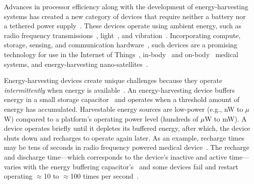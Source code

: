 

Advances in processor efficiency along with the development of
energy-harvesting systems has created a new category of devices that require
neither a battery nor a tethered power
supply~\citep{prasad_comst_2014,lucia_snapl_2017,soyata_csm_2016}. These
devices operate using ambient energy, such as radio frequency
transmissions~\citep{rf_powered_computing_gollakota_2014},
light~\citep{margolies_infocom_2016,margolies_tosn_2016}, and
vibration~\citep{gorlatova_sigmetrics_2014}. Incorporating compute, storage,
sensing, and communication hardware~\citep{wisp5,moo,capybara}, such devices are a
promising technology for use in the Internet of Things~\citep{ku_cst_2016},
in-body~\citep{nadeau_naturebio_2017} and
on-body~\citep{bandodkar_electroanalysis_2015} medical systems, and
energy-harvesting nano-satellites~\citep{kicksat,capybara}.

Energy-harvesting devices create unique challenges because they operate {\em
intermittently} when energy is
available~\citep{hicks_isca_2017,lucia_snapl_2017}. An energy-harvesting device
buffers energy in a small storage capacitor~\citep{gorlatova_tmc_2013,gunduz_commag_2014} and operates when a
threshold amount of energy has accumulated. Harvestable energy sources are low-power (e.g., nW to $\mu$W) compared to a platform's operating
power level (hundreds of $\mu$W to mW). A device operates briefly until it depletes its buffered energy, after which, the device shuts
down and recharges to operate again later. As an example, recharge times may be
tens of seconds in radio frequency powered medical device~\cite[Fig.
3c]{nadeau_naturebio_2017}.  The recharge and discharge time---which corresponds to the device's inactive and active time---varies with the energy buffering capacitor's~\cite{capybara} and some devices fail and restart operating $\approx$10 to
$\approx$100 times per second~\citep{tan_infocom_2016,mementos,nvp}.

